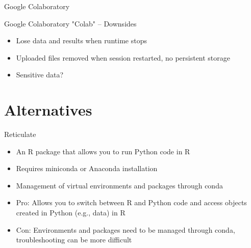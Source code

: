 \documentclass[10pt, aspectratio=169]{beamer}
\newcommand{\cemph}[1]{\textcolor{mzescyan}{#1}}
\begin{document}
{\begin{frame}{Google Colaboratory}
    
\end{frame}

\begin{frame}{Google Colaboratory}
    \small
    \cemph{"Colab"} -- Downsides
    \begin{itemize}
        \item Lose data and results when runtime stops
        \item Uploaded files removed when session restarted, no persistent storage 
        \item Sensitive data?
        \end{itemize}
    
    
\end{frame}

 	\section{Alternatives}
\begin{frame}{Reticulate}
    \begin{itemize}
        \item An R package that allows you to run Python code in R
        \item Requires miniconda or Anaconda installation
        \item Management of virtual environments and packages through conda
        \item Pro: Allows you to switch between R and Python code and access objects created in Python (e.g., data) in R
        \item Con: Environments and packages need to be managed through conda, troubleshooting can be more difficult
    \end{itemize}
\end{frame}

}
\end{document}
